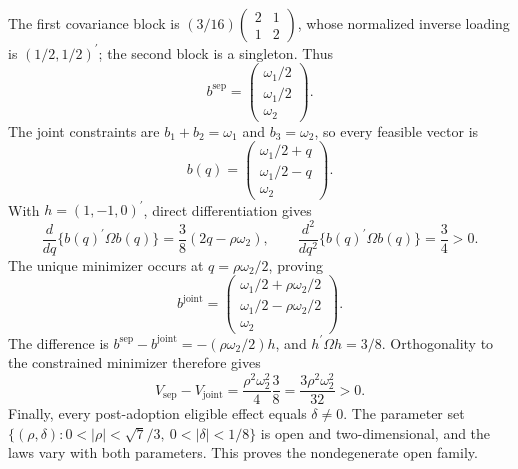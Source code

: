 The first covariance block is \((3/16)\begin{pmatrix}2&1\\1&2\end{pmatrix}\), whose normalized inverse loading is \((1/2,1/2)^{\prime}\); the second block is a singleton. Thus
\[
 b^{\mathrm{sep}}=
 \begin{pmatrix}\omega_1/2\\ \omega_1/2\\ \omega_2\end{pmatrix}.
\]
The joint constraints are \(b_1+b_2=\omega_1\) and \(b_3=\omega_2\), so every feasible vector is
\[
 b(q)=
 \begin{pmatrix}
 \omega_1/2+q\\
 \omega_1/2-q\\
 \omega_2
 \end{pmatrix}.
\]
With \(h=(1,-1,0)^{\prime}\), direct differentiation gives
\[
 \frac{d}{dq}\{b(q)^{\prime}\Omega b(q)\}
 =\frac38(2q-\rho\omega_2),
 \qquad
 \frac{d^2}{dq^2}\{b(q)^{\prime}\Omega b(q)\}=\frac34>0.
\]
The unique minimizer occurs at \(q=\rho\omega_2/2\), proving
\[
 b^{\mathrm{joint}}=
 \begin{pmatrix}
 \omega_1/2+\rho\omega_2/2\\
 \omega_1/2-\rho\omega_2/2\\
 \omega_2
 \end{pmatrix}.
\]
The difference is \(b^{\mathrm{sep}}-b^{\mathrm{joint}}=-(\rho\omega_2/2)h\), and \(h^{\prime}\Omega h=3/8\). Orthogonality to the constrained minimizer therefore gives
\[
 V_{\mathrm{sep}}-V_{\mathrm{joint}}
 =\frac{\rho^2\omega_2^2}{4}\frac38
 =\frac{3\rho^2\omega_2^2}{32}>0.
\]
Finally, every post-adoption eligible effect equals \(\delta\ne0\). The parameter set \(\{(\rho,\delta):0<|\rho|<\sqrt7/3,\ 0<|\delta|<1/8\}\) is open and two-dimensional, and the laws vary with both parameters. This proves the nondegenerate open family.